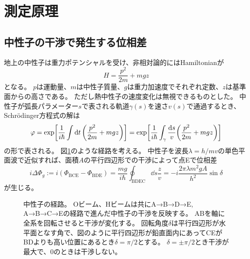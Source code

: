 \documentclass[dvipdfmx]{jsarticle}
\begin{document}
\section{測定原理}


\subsection{中性子の干渉で発生する位相差}

地上の中性子は重力ポテンシャルを受け、非相対論的にはHamiltonianが
\begin{equation*}
    H
    =
    \frac{p^2}{2m}+mgz
\end{equation*}
となる。
$p$は運動量、$m$は中性子質量、$g$は重力加速度でそれぞれ定数、$z$は基準面からの高さである。
ただし熱中性子の速度変化は無視できるものとした。
中性子が弧長パラメーター$s$で表される軌道$\gamma(s)$を速さ$v(s)$で通過するとき、Schrödinger方程式の解は
\begin{equation*}
    \varphi
    =
    \exp[
        \frac{1}{i\hbar}\int\dd{t}
        \qty(
            \frac{p^2}{2m}+mgz
        )
    ]
    =
    \exp[
        \frac{1}{i\hbar}\int_\gamma\frac{\dd{s}}{v}
        \qty(\frac{p^2}{2m}+mgz)
    ]
\end{equation*}
の形で表される。
図\ref{fig: theoretical: neutron paths and O/H beams}のような経路を考える。
中性子を波長$\lambda=h/mv$の単色平面波で近似すれば、面積$A$の平行四辺形での干渉によって点Eで位相差
\begin{equation}
    i\Delta\Phi_g
    :=
    i(\Phi_\mathrm{BCE}-\Phi_\mathrm{BDE})
    =
    \frac{mg}{i\hbar}
    \oint_\mathrm{BDEC}\dd{s}\frac{z}{v}
    =
    -i\frac{2\pi\lambda m^2gA}{h^2}\sin\delta
\end{equation}
が生じる。

\begin{figure}
    \centering
    \caption{
        中性子の経路。
        Oビーム、Hビームは共にA→B→D→E, A→B→C→Eの経路で進んだ中性子の干渉を反映する。
        ABを軸に全系を回転させると干渉が変化する。
        回転角度$\delta$は平行四辺形が水平面となす角で、図のように平行四辺形が鉛直面内にあってCEがBDよりも高い位置にあるとき$\delta=\pi/2$とする。
        $\delta=\pm\pi/2$とき干渉が最大で、$0$のときは干渉しない。
    }
    \label{fig: theoretical: neutron paths and O/H beams}
\end{figure}
\end{document}
